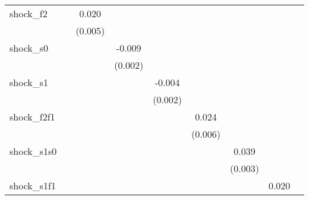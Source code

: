 {\begin{tabular}{l*{8}{c}}
\addlinespace
shock\_f2    &                     &       0.020\sym{***}&                     &                     &                     &                     &                     &                     \\
            &                     &     (0.005)         &                     &                     &                     &                     &                     &                     \\
\addlinespace
shock\_s0    &                     &                     &      -0.009\sym{***}&                     &                     &                     &                     &                     \\
            &                     &                     &     (0.002)         &                     &                     &                     &                     &                     \\
\addlinespace
shock\_s1    &                     &                     &                     &      -0.004\sym{**} &                     &                     &                     &                     \\
            &                     &                     &                     &     (0.002)         &                     &                     &                     &                     \\
\addlinespace
shock\_f2f1  &                     &                     &                     &                     &       0.024\sym{***}&                     &                     &                     \\
            &                     &                     &                     &                     &     (0.006)         &                     &                     &                     \\
\addlinespace
shock\_s1s0  &                     &                     &                     &                     &                     &       0.039\sym{***}&                     &                     \\
            &                     &                     &                     &                     &                     &     (0.003)         &                     &                     \\
\addlinespace
shock\_s1f1  &                     &                     &                     &                     &                     &                     &       0.020\sym{***}&                     \\

\end{tabular}}
